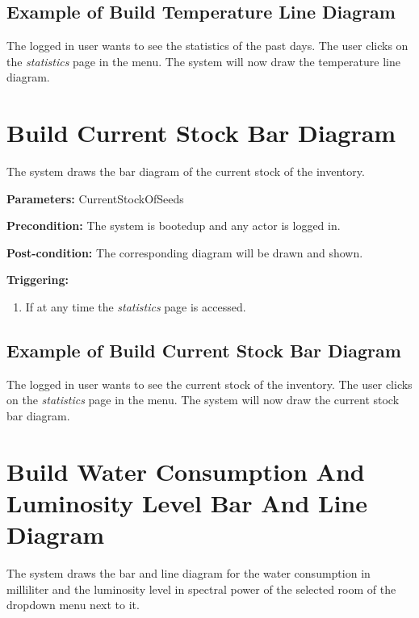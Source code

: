 \subsection{Example of Build Temperature Line Diagram}
The logged in user wants to see the statistics of the past days.
The user clicks on the \emph{statistics} page in the menu.
The system will now draw the temperature line diagram.




\section{Build Current Stock Bar Diagram}
\label{operation:BuildCurrentStockDiagram}
The system draws the bar diagram of the current stock of the inventory.

\begin{description}

\item \textbf{Parameters:} CurrentStockOfSeeds
\item \textbf{Precondition:} The system is bootedup and any actor is logged in.
\item \textbf{Post-condition:} The corresponding diagram will be drawn and
shown.

\item \textbf{Triggering:}
\begin{enumerate}
\item If at any time the \emph{statistics} page is accessed.
\end{enumerate}
\end{description}

\subsection{Example of Build Current Stock Bar Diagram}
The logged in user wants to see the current stock of the inventory.
The user clicks on the \emph{statistics} page in the menu.
The system will now draw the current stock bar diagram.




\section{Build Water Consumption And Luminosity Level Bar And Line Diagram}
\label{operation:BuildWaterConsumptionAndLuminosityLevelDiagram}
The system draws the bar and line diagram for the water consumption in
milliliter and the luminosity level in spectral power of the selected room of
the dropdown menu next to it.


